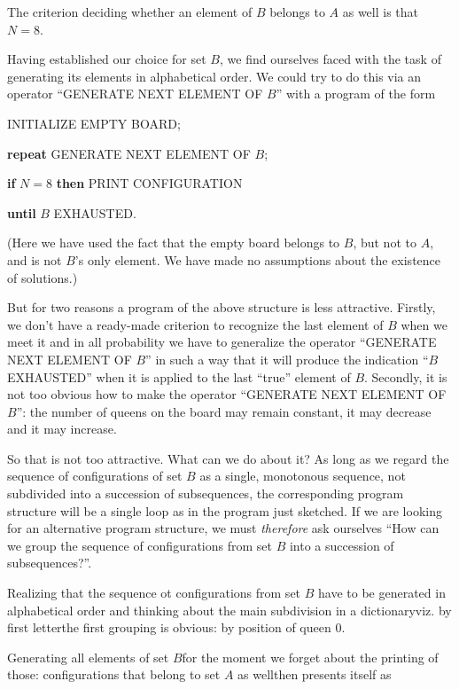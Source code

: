 \documentclass[twoside,11pt]{book}
\begin{document}
The criterion deciding whether an element of $B$ belongs to $A$ as well is that $N = 8$.

Having established our choice for set $B$, we find ourselves faced with the task of generating its elements in alphabetical order. We could try to do this via an operator ``GENERATE NEXT ELEMENT OF $B$'' with a program of the form

INITIALIZE EMPTY BOARD;

\textbf{\textbf{repeat}} GENERATE NEXT ELEMENT OF $B$;

\quad \textbf{if} $N = 8$ \textbf{then} PRINT CONFIGURATION

\textbf{until} $B$ EXHAUSTED.

\noindent
(Here we have used the fact that the empty board belongs to $B$, but not to $A$, and is not $B$'s only element. We have made no assumptions about the existence of solutions.)

But for two reasons a program of the above structure is less attractive. Firstly, we don't have a ready-made criterion to recognize the last element of $B$ when we meet it and in all probability we have to generalize the operator ``GENERATE NEXT ELEMENT OF $B$'' in such a way that it will produce the indication ``$B$ EXHAUSTED'' when it is applied to the last ``true'' element of $B$. Secondly, it is not too obvious how to make the operator ``GENERATE NEXT ELEMENT OF $B$'': the number of queens on the board may remain constant, it may decrease and it may increase.

So that is not too attractive. What can we do about it? As long as we regard the sequence of configurations of set $B$ as a single, monotonous sequence, not subdivided into a succession of subsequences, the corresponding program structure will be a single loop as in the program just sketched. If we are looking for an alternative program structure, we must \textit{therefore} ask ourselves ``How can we group the sequence of configurations from set $B$ into a succession of subsequences?''.

Realizing that the sequence ot configurations from set $B$ have to be generated in alphabetical order and thinking about the main subdivision in a dictionary\textemdash{}viz. by first letter\textemdash{}the first grouping is obvious: by position of queen 0.

Generating all elements of set $B$\textemdash{}for the moment we forget about the printing of those: configurations that belong to set $A$ as well\textemdash{}then presents itself as
\end{document}

